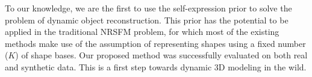To our knowledge, we are the first to use the self-expression prior to solve the problem of dynamic object reconstruction. This prior has the potential to be applied in the traditional NRSFM problem, for which most of the existing methods make use of the assumption of representing shapes using a fixed number ($K$) of shape bases. Our proposed method was successfully evaluated on both real and synthetic data. This is a first step towards dynamic 3D modeling in the wild. 




